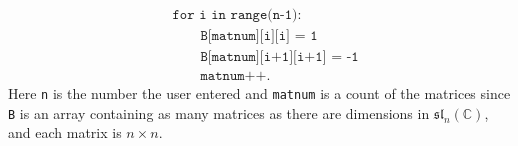 \documentclass[12pt]{article}
\theoremstyle{definition}
\theoremstyle{definition}
\begin{document}
\begin{enumerate}
\begin{enumerate}
\begin{equation*}
                        \begin{split}
                            &\texttt{for i in range(n-1):} \\
                            &\quad\quad\texttt{B[matnum][i][i] = 1} \\
                            &\quad\quad\texttt{B[matnum][i+1][i+1] = -1} \\
                            &\quad\quad\texttt{matnum++}.
                        \end{split} 
                    \end{equation*}
                    Here \texttt{n} is the number the user entered and
                    \texttt{matnum} is a count of the matrices since \texttt{B}
                    is an array containing as many matrices as there are
                    dimensions in $\mathfrak{sl}_n(\mathbb{C})$, and each
                    matrix is $n\times n$.
            \end{enumerate}
    \end{enumerate}
\end{document}
